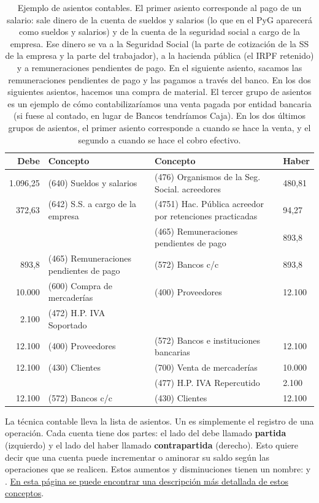 \documentclass[nochap,palatino,shortheader]{apuntes}
\begin{document}
\begin{table}[hbtp]
\centering
\begin{tabular}{r|p{5cm}||p{5cm}|l}
\textbf{Debe} & \textbf{Concepto} & \textbf{Concepto} & \textbf{Haber} \\ \toprule
1.096,25 & (640) Sueldos y salarios & (476) Organismos de la Seg. Social. acreedores & 480,81 \\
372,63 & (642) S.S. a cargo de la empresa & (4751) Hac. Pública acreedor por retenciones practicadas & 94,27 \\
 & & (465) Remuneraciones pendientes de pago & 893,8 \\ \midrule
 893,8 & (465) Remuneraciones pendientes de pago & (572) Bancos c/c & 893,8 \\ \midrule \midrule
10.000 	& (600) Compra de mercaderías & (400) Proveedores &	12.100 \\
2.100 	& (472) H.P. IVA Soportado & &  \\ \midrule
12.100 	& (400) Proveedores & (572) Bancos e instituciones bancarias &	12.100 \\ \midrule \midrule
12.100 	& (430) Clientes & 	 (700) Venta de mercaderías & 10.000 \\
 & & (477) H.P. IVA Repercutido & 2.100 \\ \midrule
12.100 & (572) Bancos c/c & (430) Clientes & 12.100 \\
 \bottomrule
\end{tabular}
\caption{Ejemplo de asientos contables. El primer asiento corresponde al pago de un salario: sale dinero de la cuenta de sueldos y salarios (lo que en el PyG aparecerá como sueldos y salarios) y de la cuenta de la seguridad social a cargo de la empresa. Ese dinero se va a la Seguridad Social (la parte de cotización de la SS de la empresa y la parte del trabajador), a la hacienda pública (el IRPF retenido) y a remuneraciones pendientes de pago. En el siguiente asiento, sacamos las remuneraciones pendientes de pago y las pagamos a través del banco. En los dos siguientes asientos, hacemos una compra de material. El tercer grupo de asientos es un ejemplo de cómo contabilizaríamos una venta pagada por entidad bancaria (si fuese al contado, en lugar de Bancos tendríamos Caja). En los dos últimos grupos de asientos, el primer asiento corresponde a cuando se hace la venta, y el segundo a cuando se hace el cobro efectivo.}
\label{tab:Asientos}
\end{table}

La técnica contable lleva la lista de asientos. Un  es simplemente el registro de una operación. Cada cuenta tiene dos partes: el lado del debe llamado \textbf{partida} (izquierdo) y el lado del haber llamado \textbf{contrapartida} (derecho). Esto quiere decir que una cuenta puede incrementar o aminorar su saldo según las operaciones que se realicen. Estos aumentos y disminuciones tienen un nombre:  y . \href{http://www.plangeneralcontable.com/?tit=guia-de-contabilidad-para-torpes&name=GeTia&contentId=man_ctorpes&manPage=8}{En esta página se puede encontrar una descripción más detallada de estos conceptos}.
\end{document}
